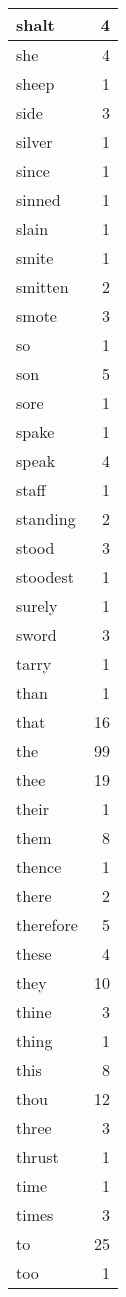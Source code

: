 \begin{center}
\begin{longtable}{l|r}
shalt & 4\\ \hline 
she & 4\\ \hline 
sheep & 1\\ \hline 
side & 3\\ \hline 
silver & 1\\ \hline 
since & 1\\ \hline 
sinned & 1\\ \hline 
slain & 1\\ \hline 
smite & 1\\ \hline 
smitten & 2\\ \hline 
smote & 3\\ \hline 
so & 1\\ \hline 
son & 5\\ \hline 
sore & 1\\ \hline 
spake & 1\\ \hline 
speak & 4\\ \hline 
staff & 1\\ \hline 
standing & 2\\ \hline 
stood & 3\\ \hline 
stoodest & 1\\ \hline 
surely & 1\\ \hline 
sword & 3\\ \hline 
tarry & 1\\ \hline 
than & 1\\ \hline 
that & 16\\ \hline 
the & 99\\ \hline 
thee & 19\\ \hline 
their & 1\\ \hline 
them & 8\\ \hline 
thence & 1\\ \hline 
there & 2\\ \hline 
therefore & 5\\ \hline 
these & 4\\ \hline 
they & 10\\ \hline 
thine & 3\\ \hline 
thing & 1\\ \hline 
this & 8\\ \hline 
thou & 12\\ \hline 
three & 3\\ \hline 
thrust & 1\\ \hline 
time & 1\\ \hline 
times & 3\\ \hline 
to & 25\\ \hline 
too & 1\\ \hline 

\end{longtable}
\end{center}
